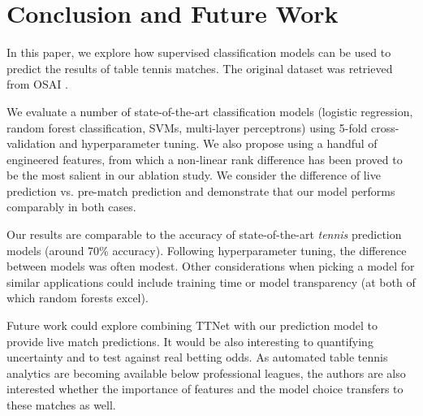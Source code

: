 \section{Conclusion and Future Work} \label{sec:conc}
In this paper, we explore how supervised classification models can be used to predict the results of table tennis matches.  The original dataset was retrieved from OSAI \cite{OSAI}.

We evaluate a number of state-of-the-art classification models (logistic regression, random forest classification, SVMs, multi-layer perceptrons) using 5-fold cross-validation and hyperparameter tuning. We also propose using a handful of engineered features, from which a non-linear rank difference has been proved to be the most salient in our ablation study. We consider the difference of live prediction vs. pre-match prediction and demonstrate that our model performs comparably in both cases.

Our results are comparable to the accuracy of state-of-the-art \textit{tennis} prediction models (around 70\% accuracy). Following hyperparameter tuning, the difference between models was often modest. Other considerations when picking a model for similar applications could include training time or model transparency (at both of which random forests excel). 

Future work could explore combining TTNet with our prediction model to provide live match predictions. It would be also interesting to quantifying uncertainty and to test against real betting odds. As automated table tennis analytics are becoming available below professional leagues, the authors are also interested whether the importance of features and the model choice transfers to these matches as well.


